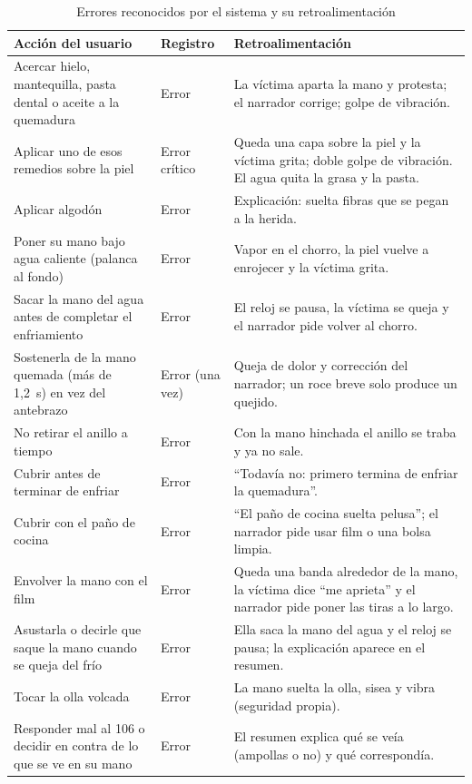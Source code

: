 \documentclass[11pt,a4paper]{article}
\begin{document}
\begin{table}[htbp]
\centering
\caption{Errores reconocidos por el sistema y su retroalimentación}
\label{tab:errores}
\small
\begin{tabularx}{\linewidth}{@{}L{4.2cm} L{2.2cm} Y@{}}
\toprule
\textbf{Acción del usuario} & \textbf{Registro} & \textbf{Retroalimentación} \\
\midrule
Acercar hielo, mantequilla, pasta dental o aceite a la quemadura & Error & La víctima aparta la mano y protesta; el narrador corrige; golpe de vibración. \\
Aplicar uno de esos remedios sobre la piel & Error crítico & Queda una capa sobre la piel y la víctima grita; doble golpe de vibración. El agua quita la grasa y la pasta. \\
Aplicar algodón & Error & Explicación: suelta fibras que se pegan a la herida. \\
Poner su mano bajo agua caliente (palanca al fondo) & Error & Vapor en el chorro, la piel vuelve a enrojecer y la víctima grita. \\
Sacar la mano del agua antes de completar el enfriamiento & Error & El reloj se pausa, la víctima se queja y el narrador pide volver al chorro. \\
Sostenerla de la mano quemada (más de 1,2~s) en vez del antebrazo & Error (una vez) & Queja de dolor y corrección del narrador; un roce breve solo produce un quejido. \\
No retirar el anillo a tiempo & Error & Con la mano hinchada el anillo se traba y ya no sale. \\
Cubrir antes de terminar de enfriar & Error & ``Todavía no: primero termina de enfriar la quemadura''. \\
Cubrir con el paño de cocina & Error & ``El paño de cocina suelta pelusa''; el narrador pide usar film o una bolsa limpia. \\
Envolver la mano con el film & Error & Queda una banda alrededor de la mano, la víctima dice ``me aprieta'' y el narrador pide poner las tiras a lo largo. \\
Asustarla o decirle que saque la mano cuando se queja del frío & Error & Ella saca la mano del agua y el reloj se pausa; la explicación aparece en el resumen. \\
Tocar la olla volcada & Error & La mano suelta la olla, sisea y vibra (seguridad propia). \\
Responder mal al 106 o decidir en contra de lo que se ve en su mano & Error & El resumen explica qué se veía (ampollas o no) y qué correspondía. \\
\bottomrule
\end{tabularx}
\end{table}
\end{document}
